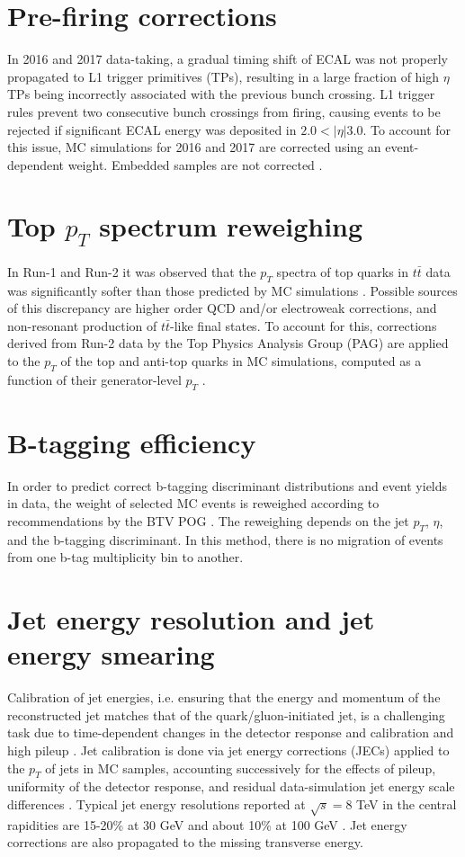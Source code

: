 \section{Pre-firing corrections}
In 2016 and 2017 data-taking, a gradual timing shift of ECAL was not properly propagated to L1 trigger primitives (TPs), resulting in a large fraction of high $\eta$ TPs being incorrectly associated with the previous bunch crossing. L1 trigger rules prevent two consecutive bunch crossings from firing, causing events to be rejected if significant ECAL energy was deposited in $2.0 < |\eta| 3.0$. To account for this issue, MC simulations for 2016 and 2017 are corrected using an event-dependent weight. Embedded samples are not corrected \cite{CMS-HIG-19-010}.

\section{Top $p_{T}$ spectrum reweighing}
In Run-1 and Run-2 it was observed that the $p_{T}$ spectra of top quarks in $t\bar{t}$ data was significantly softer than those predicted by MC simulations \cite{twiki_Top_pt_reweighing}. Possible sources of this discrepancy are higher order QCD and/or electroweak corrections, and non-resonant production of $t\bar{t}$-like final states. To account for this, corrections derived from Run-2 data by the Top Physics Analysis Group (PAG) are applied to the $p_{T}$ of the top and anti-top quarks in MC simulations, computed as a function of their generator-level $p_{T}$ \cite{twiki_Top_pt_reweighing}.

\section{B-tagging efficiency}
In order to predict correct b-tagging discriminant distributions and event yields in data, the weight of selected MC events is reweighed according to recommendations by the BTV POG \cite{twiki_btag_SF_methods}. The reweighing depends on the jet $p_{T}$, $\eta$, and the b-tagging discriminant. In this method, there is no migration of events from one b-tag multiplicity bin to another.

\section{Jet energy resolution and jet energy smearing}
Calibration of jet energies, i.e. ensuring that the energy and momentum of the reconstructed jet matches that of the quark/gluon-initiated jet, is a challenging task due to time-dependent changes in the detector response and calibration and high pileup \cite{CMS-JME-13-004} \cite{proceedings-Agarwal:2022txa}. Jet calibration is done via jet energy corrections (JECs) applied to the $p_{T}$ of jets in MC samples, accounting successively for the effects of pileup, uniformity of the detector response, and residual data-simulation jet energy scale differences \cite{twiki_JetResolution_JEC}. Typical jet energy resolutions reported at $\sqrt{s} = 8$ TeV in the central rapidities are 15-20\% at 30 GeV and about 10\% at 100 GeV \cite{CMS-JME-13-004}. Jet energy corrections are also propagated to the missing transverse energy.

